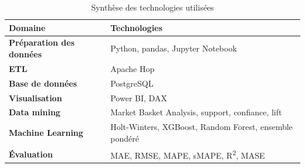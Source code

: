 \documentclass[12pt,a4paper,twoside]{report}
\begin{document}
\begin{table}[H]
\centering
{}
\begin{tabularx}{\textwidth}{>{\bfseries}p{4cm}X}
\toprule
\rowcolor{TableHeader}
\color{white}Domaine & \color{white}Technologies \\
\midrule
Préparation des données & Python, pandas, Jupyter Notebook \\
ETL & Apache Hop \\
Base de données & PostgreSQL \\
Visualisation & Power BI, DAX \\
Data mining & Market Basket Analysis, support, confiance, lift \\
Machine Learning & Holt-Winters, XGBoost, Random Forest, ensemble pondéré \\
Évaluation & MAE, RMSE, MAPE, sMAPE, R\textsuperscript{2}, MASE \\
\bottomrule
\end{tabularx}
\caption{Synthèse des technologies utilisées}
\end{table}
\end{document}
